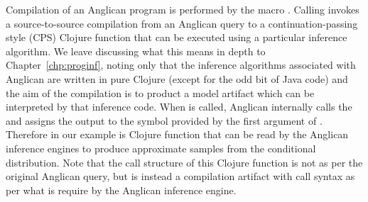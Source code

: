 Compilation of an Anglican program is performed by the macro \query.  Calling \query
invokes a source-to-source compilation from an Anglican query to a continuation-passing 
style (CPS) Clojure function that can be executed using a particular inference algorithm.  We
leave discussing what this means in depth to Chapter~\ref{chp:proginf}, noting only that
the inference algorithms associated with Anglican are written in pure Clojure (except for the odd
bit of Java code) and the aim of the compilation is to product a model artifact which can be
interpreted by that inference code.
When  is called, Anglican internally calls the \query and assigns the output to
the symbol provided by the first argument of .  Therefore {\small {}} in
our example is Clojure function that can be read by the Anglican inference engines to produce
approximate samples from the conditional distribution.  Note that the call structure of this Clojure
function is not as per the original Anglican query, but is instead a compilation artifact with
call syntax as per what is require by the Anglican inference engine.

